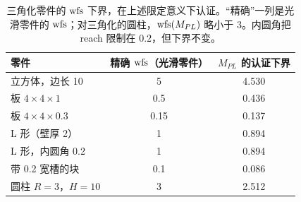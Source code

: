 \begin{table}[h]
\centering
\begin{tabular}{lcc}
\toprule
零件 & 精确 $\operatorname{wfs}$（光滑零件） & $M_{PL}$ 的认证下界 \\
\midrule
立方体，边长 10 & 5 & 4.530 \\
板 $4\times4\times1$ & 0.5 & 0.436 \\
板 $4\times4\times0.3$ & 0.15 & 0.137 \\
L 形（壁厚 2） & 1 & 0.894 \\
L 形，内圆角 0.2 & 1 & 0.894 \\
带 0.2 宽槽的块 & 0.1 & 0.086 \\
圆柱 $R=3$，$H=10$ & 3 & 2.512 \\
\bottomrule
\end{tabular}
\caption{三角化零件的 $\operatorname{wfs}$ 下界，在上述限定意义下认证。``精确''一列是光滑零件的 $\operatorname{wfs}$；对三角化的圆柱，$\operatorname{wfs}(M_{PL})$ 略小于 $3$。内圆角把 reach 限制在 $0.2$，但下界不变。}\label{tab:wfs}
\end{table}
